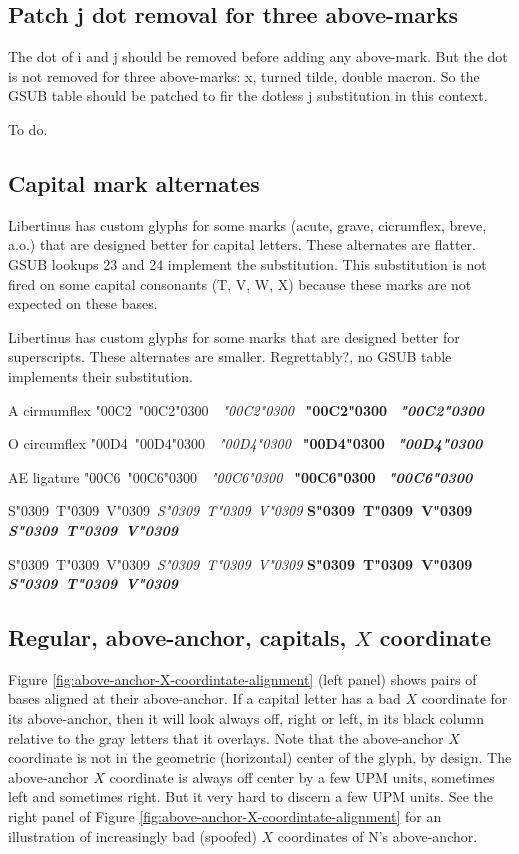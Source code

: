 \documentclass[landscape]{article}
\newcommand{\ribbiline}[1]{#1\ 
	{\itshape #1}
	{\bfseries #1}
	{\itshape\bfseries #1}}
\begin{document}
\subsection*{Patch j dot removal for three above-marks}

The dot of i and j should be removed before adding any above-mark.
But the dot is not removed for three above-marks: x, turned tilde, double macron.
So the GSUB table should be patched to fir the dotless j substitution in this context.

To do.

\subsection*{Capital mark alternates}

Libertinus has custom glyphs for some marks (acute, grave, cicrumflex, breve, a.o.) that are designed better for capital letters.
These alternates are flatter.
GSUB lookups 23 and 24 implement the substitution.
This substitution is not fired on some capital consonants (T, V, W, X) because these marks are not expected on these bases.

Libertinus has custom glyphs for some marks that are designed better for superscripts.
These alternates are smaller.
Regrettably?, no GSUB table implements their substitution.

A cirmumflex \char"00C2\ \ribbiline{\char"00C2\char"0300\ }

O circumflex \char"00D4\ \ribbiline{\char"00D4\char"0300\ }

AE ligature \char"00C6\  \ribbiline{\char"00C6\char"0300\ }

\ribbiline{S\char"0309\ T\char"0309\ V\char"0309}

{\LibertinusSerifPatch
	\ribbiline{S\char"0309\ T\char"0309\ V\char"0309}
}

\subsection*{Regular, above-anchor, capitals, $X$ coordinate}

Figure \ref{fig:above-anchor-X-coordintate-alignment} (left panel) shows pairs of bases aligned at their above-anchor.
If a capital letter has a bad $X$ coordinate for its above-anchor, then it will look always off, 
right or left, in its black column relative to the gray letters that it overlays.
Note that the above-anchor $X$ coordinate is not in the geometric (horizontal) center of the glyph, by design.
The above-anchor $X$ coordinate is always off center by a few UPM units, sometimes left and sometimes right.
But it very hard to discern a few UPM units. 
See the right panel of Figure \ref{fig:above-anchor-X-coordintate-alignment} for an illustration of increasingly bad (spoofed) $X$ coordinates of N's above-anchor.
\end{document}
